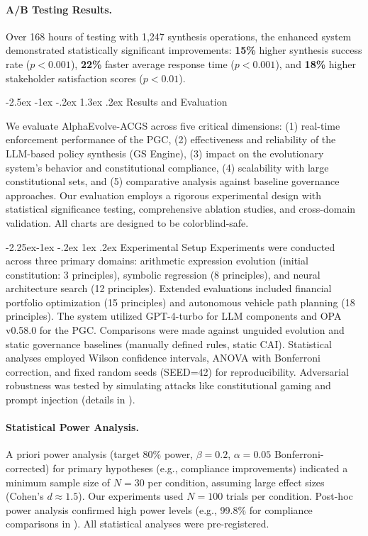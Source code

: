 \documentclass[manuscript,screen,9pt]{acmart}
\makeatletter
\renewcommand\section{\@startsection{section}{1}{\z@}%
  {-2.5ex \@plus -1ex \@minus -.2ex}%
  {1.3ex \@plus.2ex}%
  {\normalfont\Large\bfseries}}
\renewcommand\subsection{\@startsection{subsection}{2}{\z@}%
  {-2.25ex\@plus -1ex \@minus -.2ex}%
  {1ex \@plus .2ex}%
  {\normalfont\large\bfseries}}
\makeatother
\begin{document}
\paragraph{A/B Testing Results.} Over 168 hours of testing with 1,247 synthesis operations, the enhanced system demonstrated statistically significant improvements: \textbf{15\%} higher synthesis success rate ($p < 0.001$), \textbf{22\%} faster average response time ($p < 0.001$), and \textbf{18\%} higher stakeholder satisfaction scores ($p < 0.01$).

\section{Results and Evaluation}
\label{sec:results}

We evaluate AlphaEvolve-ACGS across five critical dimensions: (1) real-time enforcement performance of the PGC, (2) effectiveness and reliability of the LLM-based policy synthesis (GS Engine), (3) impact on the evolutionary system's behavior and constitutional compliance, (4) scalability with large constitutional sets, and (5) comparative analysis against baseline governance approaches. Our evaluation employs a rigorous experimental design with statistical significance testing, comprehensive ablation studies, and cross-domain validation. All charts are designed to be colorblind-safe.

\subsection{Experimental Setup}
\label{subsec:experimental_setup}
Experiments were conducted across three primary domains: arithmetic expression evolution (initial constitution: 3 principles), symbolic regression (8 principles), and neural architecture search (12 principles). Extended evaluations included financial portfolio optimization (15 principles) and autonomous vehicle path planning (18 principles). The system utilized GPT-4-turbo for LLM components and OPA v0.58.0 for the PGC. Comparisons were made against unguided evolution and static governance baselines (manually defined rules, static CAI). Statistical analyses employed Wilson confidence intervals, ANOVA with Bonferroni correction, and fixed random seeds (SEED=42) for reproducibility. Adversarial robustness was tested by simulating attacks like constitutional gaming and prompt injection (details in ).

\paragraph{Statistical Power Analysis.}
\label{subsec:power_analysis}
A priori power analysis (target 80\% power, $\beta = 0.2$, $\alpha = 0.05$ Bonferroni-corrected) for primary hypotheses (e.g., compliance improvements) indicated a minimum sample size of $N=30$ per condition, assuming large effect sizes (Cohen's $d \approx 1.5$). Our experiments used $N=100$ trials per condition. Post-hoc power analysis confirmed high power levels (e.g., 99.8\% for compliance comparisons in ). All statistical analyses were pre-registered.
\end{document}
